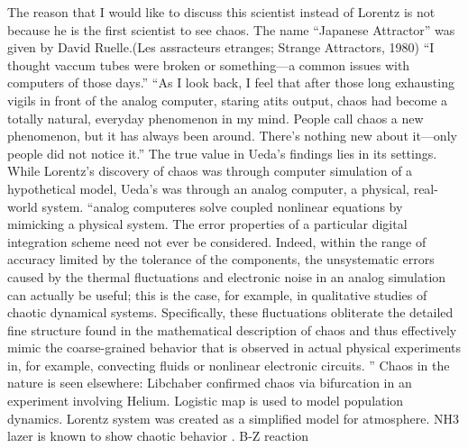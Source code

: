 \documentclass[12pt,twoside,draft]{book}
\begin{document}
The reason that I would like to discuss this scientist instead of Lorentz is not because he is the first scientist to see chaos.
The name ``Japanese Attractor'' was given by David Ruelle.(Les assracteurs etranges; Strange Attractors, 1980)
``I thought vaccum tubes were broken or something---a common issues with computers of those days.'' \citep{lorentzbook} %
``As I look back, I feel that after those long exhausting vigils in front of the analog computer, staring atits output, chaos had become a totally natural, everyday phenomenon in my mind.
People call chaos a new phenomenon, but it has always been around.
There's nothing new about it---only people did not notice it.''\cite[p27]{ueda-abraham}
The true value in Ueda's findings lies in its settings.
While Lorentz's discovery of chaos was through computer simulation of a hypothetical model, Ueda's was through an analog computer, a physical, real-world system.
``analog computeres solve coupled nonlinear equations by mimicking a physical system.
The error properties of a particular digital integration scheme need not ever be considered.
Indeed, within the range of accuracy limited by the tolerance of the components, the unsystematic errors caused by the thermal fluctuations and electronic noise in an analog simulation can actually be useful; this is the case, for example, in qualitative studies of chaotic dynamical systems.
Specifically, these fluctuations obliterate the detailed fine structure found in the mathematical description of chaos and thus effectively mimic the coarse-grained behavior that is observed in actual physical experiments in, for example, convecting fluids or nonlinear electronic circuits.
''\cite[p.383]{campbell}
Chaos in the nature is seen elsewhere:
Libchaber confirmed chaos via bifurcation in an experiment involving Helium.
Logistic map is used to model population dynamics.
Lorentz system was created as a simplified model for atmosphere.
NH3 lazer is known to show chaotic behavior \citep{kantz-schreiber}.
B-Z reaction
\end{document}

